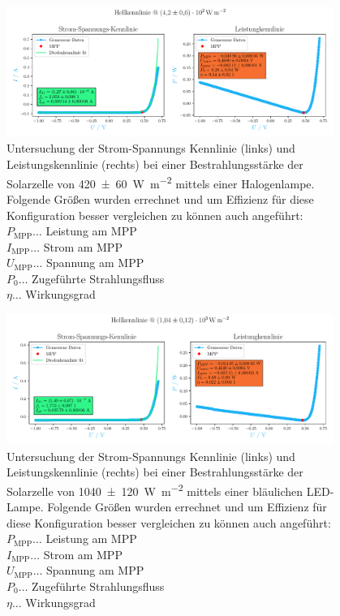 \documentclass[12pt,english,ngerman]{scrartcl}
\begin{document}
\begin{figure}[H]
	\centering
	\includegraphics[width=0.95\textwidth]{figures/helllampe2.pdf}
	\caption{Untersuchung der Strom-Spannungs Kennlinie
		(links) und Leistungskennlinie (rechts) bei einer
		Bestrahlungsstärke der Solarzelle von \SI{420(60)}{\watt\per\meter\squared}
		mittels einer Halogenlampe.
		Folgende Größen wurden errechnet und um Effizienz für diese Konfiguration
		besser vergleichen zu können auch angeführt: \\
		$P_\text{MPP} \dots$ Leistung am MPP         \\
		$I_\text{MPP} \dots$ Strom am MPP            \\
		$U_\text{MPP} \dots$ Spannung am MPP         \\
		$P_0 \dots$ Zugeführte Strahlungsfluss       \\
		$\eta \dots$ Wirkungsgrad
	}\label{fig:ausw_kennlinie_hell_lampe2}
\end{figure}

\begin{figure}[H]
	\centering
	\includegraphics[width=0.95\textwidth]{figures/hellled.pdf}
	\caption{Untersuchung der Strom-Spannungs Kennlinie
		(links) und Leistungskennlinie (rechts) bei einer
		Bestrahlungsstärke der Solarzelle von \SI{1040(120)}{\watt\per\meter\squared}
		mittels einer bläulichen LED-Lampe.
		Folgende Größen wurden errechnet und um Effizienz für diese Konfiguration
		besser vergleichen zu können auch angeführt: \\
		$P_\text{MPP} \dots$ Leistung am MPP         \\
		$I_\text{MPP} \dots$ Strom am MPP            \\
		$U_\text{MPP} \dots$ Spannung am MPP         \\
		$P_0 \dots$ Zugeführte Strahlungsfluss       \\
		$\eta \dots$ Wirkungsgrad
	}\label{fig:ausw_kennlinie_hell_led}
\end{figure}
\end{document}

